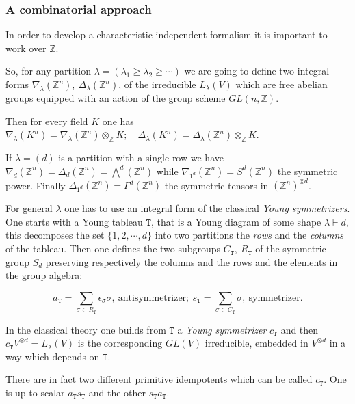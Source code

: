 \documentclass[10pt]{amsart}
\newcommand{\e}{\epsilon}
\theoremstyle{definition}
\theoremstyle{remark}
\newcommand{\Z}{\mathbb Z}
\begin{document}
\subsubsection{A combinatorial  approach}  In order to develop a characteristic-independent formalism   
it is important to work over $\Z$.  \medskip


So,  for  any partition $\lambda=(\lambda_1\geq\lambda_2\geq\cdots)$ we are going to   define two integral forms $ \nabla_\lambda(\Z^n),\ \Delta_\lambda(\Z^n)$,  of the irreducible $L_\lambda(V)$
which  are free abelian groups equipped with an action of the group scheme $GL(n,\Z)$. 

 Then for every field $K$  one has $\nabla_\lambda(K^n)=\nabla_\lambda(\Z^n)\otimes_\Z K;\quad \Delta_\lambda(K^n)=\Delta_\lambda(\Z^n)\otimes_\Z K$.\medskip

 
If $\lambda=(d)$ is a partition with a single row  we have  $\nabla_d(\Z^n)=\Delta_d(\Z^n)=\bigwedge^d(\Z^n)$ while $\nabla_{1^d}(\Z^n)=S^d(\Z^n)$ the symmetric power.  Finally $\Delta_{1^d}(\Z^n)=\Gamma^d(\Z^n)$ the symmetric tensors in  $(\Z^n)^{\otimes d}$. \medskip

For general $\lambda$  one has to use an integral form of the classical {\em Young symmetrizers}.
One starts with a Young tableau ${\mathtt T}$, that is a Young diagram of some shape $\lambda\vdash d$, this decomposes the set $\{1,2,\cdots,d\}$  into two partitions  the {\em rows}  and the {\em columns} of the tableau.   Then  one defines the two subgroups $C_{\mathtt T},\ R_{\mathtt T}$ of the symmetric group $S_d$  preserving respectively the columns and the rows  and the elements in the group algebra:

\begin{equation}\label{youngs}
a_{\mathtt T}=\sum_{ \sigma\in R_{\mathtt T}}\e_\sigma \sigma,\ \text{antisymmetrizer};\  s_{\mathtt T}=\sum_{ \sigma\in C_{\mathtt T}} \sigma,\ \text{symmetrizer.}
\end{equation} 

In the classical theory one builds from ${\mathtt T}$ a {\em Young symmetrizer}  $c_{\mathtt T}$  and  then $c_{\mathtt T}V^{\otimes d}  =L_\lambda(V)$  is the corresponding $GL(V)$ irreducible, embedded in $V^{\otimes d}$ in a way which depends on ${\mathtt T}$.

There are in fact   two different primitive idempotents which can be called   $c_{\mathtt T}$.   One is up to scalar  $a_{\mathtt T}s_{\mathtt T}$  and the other $s_{\mathtt T}a_{\mathtt T}$.
\medskip
\end{document}
